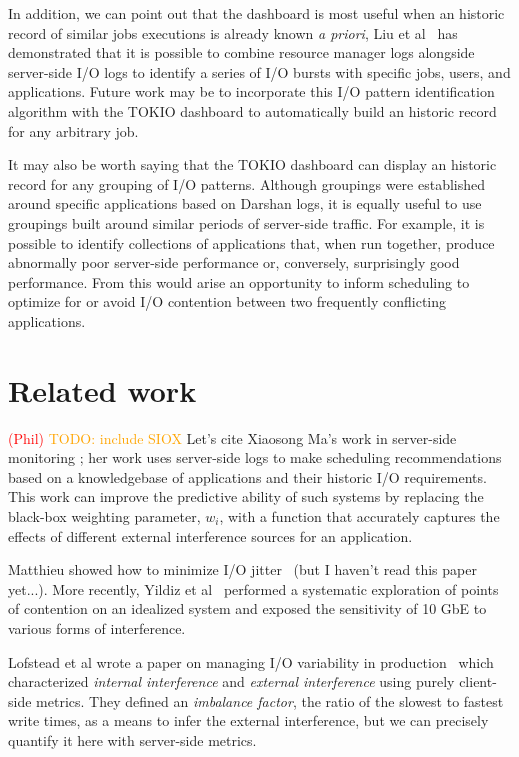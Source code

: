 \documentclass[conference,10pt,compsocconf]{IEEEtran}
\newcommand{\assign}[1]{\textcolor{red}{(#1)}}
\newcommand{\todo}[1]{\textcolor{Orange}{TODO: #1}}
\begin{document}
In addition, we can point out that the dashboard is most useful when an historic
record of similar jobs executions is already known \emph{a priori}, Liu et al~\cite{Liu2016}
has demonstrated that it is possible to combine resource manager logs alongside
server-side I/O logs to identify a series of I/O bursts with specific jobs,
users, and applications.  Future work may be to incorporate this I/O pattern
identification algorithm with the TOKIO dashboard to automatically build an
historic record for any arbitrary job.

It may also be worth saying that the TOKIO dashboard can display an historic
record for any grouping of I/O patterns.  Although groupings were established
around specific applications based on Darshan logs, it is equally useful to
use groupings built around similar periods of server-side traffic.  For example,
it is possible to identify collections of applications that, when run together,
produce abnormally poor server-side performance or, conversely, surprisingly
good performance.  From this would arise an opportunity to inform scheduling
to optimize for or avoid I/O contention between two frequently conflicting
applications.


\section{Related work} \label{sec:related}

\assign{Phil} \todo{include SIOX} Let's cite Xiaosong Ma's work in server-side
monitoring \cite{Liu2016}; her work uses server-side logs to make scheduling
recommendations based on a knowledgebase of applications and their historic
I/O requirements.  This work can improve the predictive ability of such systems
by replacing the black-box weighting parameter, $w_{i}$, with a function that
accurately captures the effects of different external interference sources for
an application.

Matthieu showed how to minimize I/O jitter~\cite{Dorier2012} (but I haven't read
this paper yet...).  More recently, Yildiz et al~\cite{Yildiz2016} performed
a systematic exploration of points of contention on an idealized system and
exposed the sensitivity of 10 GbE to various forms of interference.

Lofstead et al wrote a paper on managing I/O variability in production~
\cite{Lofstead2010} which characterized \emph{internal interference} and
\emph{external interference} using purely client-side metrics.  They defined an
\emph{imbalance factor}, the ratio of the slowest to fastest write times, as a
means to infer the external interference, but we can precisely quantify it here
with server-side metrics.
\end{document}

